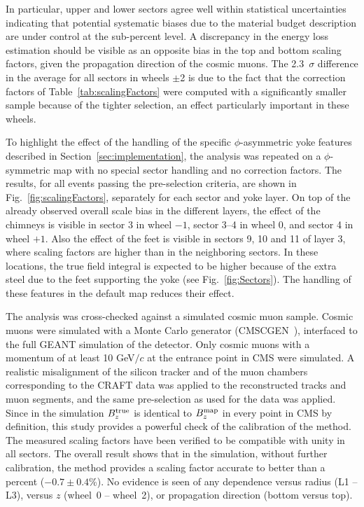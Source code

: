 In particular, upper
and lower sectors agree well within statistical uncertainties indicating
that potential systematic biases due to the material budget description are
under control at the sub-percent level. A discrepancy in
the energy loss estimation should be visible as an
opposite bias in the top and bottom scaling factors,
given the propagation direction of the cosmic muons.
The 2.3\ $\sigma$ difference in the average for all sectors in wheels
$\pm$2 is due to the fact that the correction factors of
Table~\ref{tab:scalingFactors} were computed with a significantly
smaller sample because of the tighter selection, an effect particularly
important in these wheels.

To highlight the effect of the handling of the specific $\phi$-asymmetric
yoke features described in Section~\ref{sec:implementation},
the analysis was repeated on a $\phi$-symmetric map with no special
sector handling and no correction factors.
The results, for all events passing the pre-selection criteria, are shown
in Fig.~\ref{fig:scalingFactors}, separately for each
sector and yoke layer.
On top of the already observed overall scale bias in the
different layers, the effect of the chimneys is visible in sector 3 in
wheel $-1$, sector 3--4 in wheel 0, and  sector 4 in wheel $+1$. Also the
effect of the feet is visible in sectors 9, 10 and 11 of layer 3, where
scaling factors are higher than in the neighboring sectors. In these
locations, the true field integral is expected to be higher because of the
extra steel due to the feet supporting the yoke
(see Fig.~\ref{fig:Sectors}).
The handling of these features in the default map reduces their effect.

The analysis was cross-checked against a simulated
cosmic muon sample. Cosmic muons were
simulated with a Monte Carlo generator
(CMSCGEN~\cite{Biallass:2009ev}), interfaced
to the full GEANT simulation of the detector.
Only cosmic muons with a momentum of at least
10 GeV$/c$ at the entrance point in CMS were simulated.
A realistic misalignment of the silicon tracker
and of the muon chambers corresponding to the CRAFT data was
applied to the reconstructed tracks and muon segments,
and the same pre-selection as used for the data was applied.
Since in the simulation ${B_z^{\rm true}}$ is identical
to ${B_z^{\rm map}}$ in every point in CMS by definition, this
study provides a powerful check of the calibration of the method.
The measured scaling factors have been verified to be compatible
with unity in all sectors.
The overall result shows that in the simulation,
without further calibration,
the method provides a scaling factor accurate to
better than a percent ($-0.7 \pm 0.4$\%). No evidence
is seen of any dependence versus radius (L1 -- L3),
versus $z$ (wheel~0 -- wheel~2), or propagation direction
(bottom versus top).


